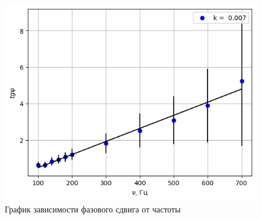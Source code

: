 \begin{figure}[h!]
    \centering
    \includegraphics[width=13cm]{images/plot2.png}
    \caption{График зависимости фазового сдвига от частоты}
\end{figure}

